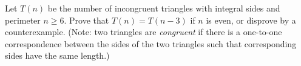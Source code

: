 Let $T(n)$ be the number of incongruent triangles with integral sides and
perimeter $n \ge 6$. Prove that $T(n) = T(n - 3)$ if $n$ is even, or disprove
by a counterexample. (Note: two triangles are {\it congruent} if there is a
one-to-one correspondence between the sides of the two triangles such that
corresponding sides have the same length.)
